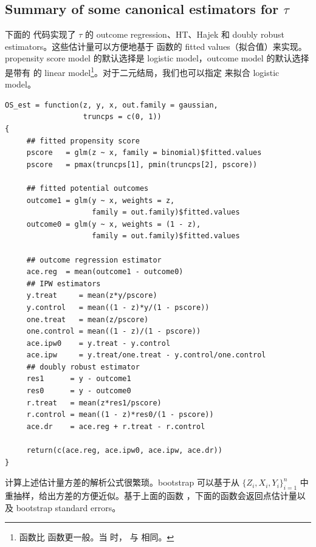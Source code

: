 \subsection{Summary of some canonical estimators for $\tau$}


下面的  代码实现了 $\tau$ 的 outcome regression、HT、Hajek 和 doubly robust estimators。这些估计量可以方便地基于  函数的 fitted values（拟合值）来实现。propensity score model 的默认选择是 logistic model，outcome model 的默认选择是带有  的 linear model\footnote{ 函数比  函数更一般。当  时， 与  相同。}。对于二元结局，我们也可以指定  来拟合 logistic model。

\begin{lstlisting}
OS_est = function(z, y, x, out.family = gaussian, 
                  truncps = c(0, 1))
{
     ## fitted propensity score
     pscore   = glm(z ~ x, family = binomial)$fitted.values
     pscore   = pmax(truncps[1], pmin(truncps[2], pscore))
     
     ## fitted potential outcomes
     outcome1 = glm(y ~ x, weights = z, 
                    family = out.family)$fitted.values
     outcome0 = glm(y ~ x, weights = (1 - z), 
                    family = out.family)$fitted.values
     
     ## outcome regression estimator
     ace.reg  = mean(outcome1 - outcome0) 
     ## IPW estimators
     y.treat     = mean(z*y/pscore)
     y.control   = mean((1 - z)*y/(1 - pscore))
     one.treat   = mean(z/pscore)
     one.control = mean((1 - z)/(1 - pscore))
     ace.ipw0    = y.treat - y.control
     ace.ipw     = y.treat/one.treat - y.control/one.control
     ## doubly robust estimator
     res1      = y - outcome1
     res0      = y - outcome0
     r.treat   = mean(z*res1/pscore)
     r.control = mean((1 - z)*res0/(1 - pscore))
     ace.dr    = ace.reg + r.treat - r.control

     return(c(ace.reg, ace.ipw0, ace.ipw, ace.dr))     
}
\end{lstlisting}


计算上述估计量方差的解析公式很繁琐。bootstrap 可以基于从 $\{ Z_i, X_i, Y_i \}_{i=1}^n$ 中重抽样，给出方差的方便近似。基于上面的函数 ，下面的函数会返回点估计量以及 bootstrap standard errors。


